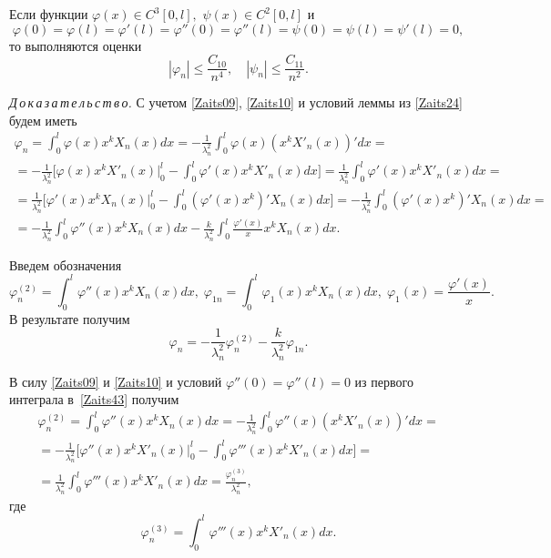 \smallskip

\hypertarget{zay:l2}{}

\begin{lemma}[3]
Если функции $\varphi(x)\in C^3[0, l],$ $\psi(x)\in C^2[0, l]$ и $$\varphi(0)=\varphi(l)=\varphi'(l)=\varphi''(0)=\varphi''(l)=\psi(0)=\psi(l)=\psi'(l)=0,$$
то выполняются оценки
\begin{equation}
\label{Zaits42}
|\varphi_n|\leq\frac{C_{10}}{n^4},\quad |\psi_n|\leq\frac{C_{11}}{n^2}.
\end{equation}
\end{lemma}

\smallskip

\textit{Д\,о\,к\,а\,з\,а\,т\,е\,л\,ь\,с\,т\,в\,о.} 
С учетом \eqref{Zaits09}, \eqref{Zaits10} и условий леммы из \eqref{Zaits24} будем иметь
\begin{multline*}
\varphi_n= \int _0^l\varphi(x)x^kX_n(x)dx=-\frac{1}{\lambda_n^2} \int _0^l\varphi(x)(x^kX'_n(x))'dx=\\
=-\frac{1}{\lambda_n^2}
\biggl[\varphi(x)x^kX'_n(x)\Bigr|_0^l- \int _0^l\varphi'(x)x^kX'_n(x)dx\biggr]=\frac{1}{\lambda_n^2} \int _0^l\varphi'(x)x^kX'_n(x)dx=\\
=\frac{1}{\lambda_n^2}
\biggl[\varphi'(x)x^kX_n(x)\Bigr|_0^l- \int _0^l(\varphi'(x)x^k)'X_n(x)dx\biggr]=-\frac{1}{\lambda_n^2} \int _0^l(\varphi'(x)x^k)'X_n(x)dx=\\
=-\frac{1}{\lambda_n^2} \int _0^l\varphi''(x)x^kX_n(x)dx-\frac{k}{\lambda_n^2} \int _0^l\frac{\varphi'(x)}{x}x^kX_n(x)dx.
\end{multline*}

Введем обозначения
\begin{equation}
\label{Zaits43}
\varphi_n^{(2)}= \int _0^l\varphi''(x)x^kX_n(x)dx,\; \varphi_{1n}= \int _0^l\varphi_1(x)x^kX_n(x)dx,\; \varphi_1(x)=\frac{\varphi'(x)}{x}.
\end{equation}
В результате получим
\begin{equation}
\label{Zaits44}
\varphi_n=-\frac{1}{\lambda_n^2}\varphi_n^{(2)}-\frac{k}{\lambda_n^2}\varphi_{1n}.
\end{equation}

В силу \eqref{Zaits09} и \eqref{Zaits10} и условий $\varphi''(0)=\varphi''(l)=0$ из первого интеграла в~\eqref{Zaits43} получим
\begin{multline}
\label{Zaits45}
\varphi_n^{(2)}= \int _0^l\varphi''(x)x^kX_n(x)dx=-\frac{1}{\lambda_n^2} \int _0^l\varphi''(x)\left(x^kX'_n(x)\right)'dx=\\
=-\frac{1}{\lambda_n^2}
\biggl[\varphi''(x)x^kX'_n(x)\Bigr|_0^l- \int _0^l\varphi'''(x)x^kX'_n(x)dx\biggr]=\\
=\frac{1}{\lambda_n^2} \int _0^l\varphi'''(x)x^kX'_n(x)dx=\frac{\varphi_n^{(3)}}{\lambda_n^2},
\end{multline}
где
$$\varphi_n^{(3)}= \int _0^l\varphi'''(x)x^kX'_n(x)dx.$$

